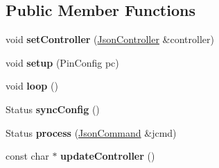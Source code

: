 \subsection*{Public Member Functions}
\begin{DoxyCompactItemize}
\item 
\hypertarget{classfirestep_1_1_machine_thread_a4fe579c1ee6423fb2ce41280b5301067}{void {\bfseries set\+Controller} (\hyperlink{classfirestep_1_1_json_controller}{Json\+Controller} \&controller)}\label{classfirestep_1_1_machine_thread_a4fe579c1ee6423fb2ce41280b5301067}

\item 
\hypertarget{classfirestep_1_1_machine_thread_a8bb7b8030b3277891792bee0584229f3}{void {\bfseries setup} (Pin\+Config pc)}\label{classfirestep_1_1_machine_thread_a8bb7b8030b3277891792bee0584229f3}

\item 
\hypertarget{classfirestep_1_1_machine_thread_ab7dab8e7bc91e51ba49f9e1f0cb93661}{void {\bfseries loop} ()}\label{classfirestep_1_1_machine_thread_ab7dab8e7bc91e51ba49f9e1f0cb93661}

\item 
\hypertarget{classfirestep_1_1_machine_thread_a5d667c949b4c23e053e82688154c7236}{Status {\bfseries sync\+Config} ()}\label{classfirestep_1_1_machine_thread_a5d667c949b4c23e053e82688154c7236}

\item 
\hypertarget{classfirestep_1_1_machine_thread_a97b101bb4bc51dc8c46d018a7af3aa24}{Status {\bfseries process} (\hyperlink{classfirestep_1_1_json_command}{Json\+Command} \&jcmd)}\label{classfirestep_1_1_machine_thread_a97b101bb4bc51dc8c46d018a7af3aa24}

\item 
\hypertarget{classfirestep_1_1_machine_thread_a31916705d92cd50bce1ea6609de2b5d5}{const char $\ast$ {\bfseries update\+Controller} ()}\label{classfirestep_1_1_machine_thread_a31916705d92cd50bce1ea6609de2b5d5}

\end{DoxyCompactItemize}
